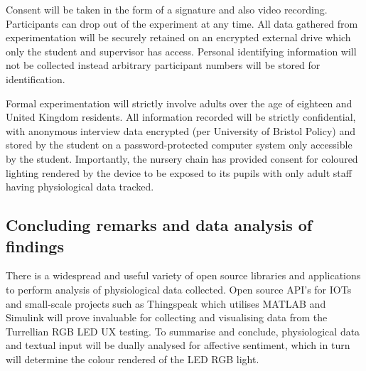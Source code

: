\documentclass{sigchi}
\begin{document}
Consent will be taken in the form of a signature and also video recording. Participants can drop out of the experiment at any time. All data gathered from experimentation will be securely retained on an encrypted external drive which only the student and supervisor has access. Personal identifying information will not be collected instead arbitrary participant numbers will be stored for identification. 

Formal experimentation will strictly involve adults over the age of eighteen and United Kingdom residents. All information recorded will be strictly confidential, with anonymous interview data encrypted (per University of Bristol Policy) and stored by the student on a password-protected computer system only accessible by the student. Importantly, the nursery chain has provided consent for coloured lighting rendered by the device to be exposed to its pupils with only adult staff having physiological data tracked. 

\subsection{Concluding remarks and data analysis of findings}

There is a widespread and useful variety of open source libraries and applications to perform analysis of physiological data collected. Open source API’s for IOTs and small-scale projects such as Thingspeak which utilises MATLAB and Simulink will prove invaluable for collecting and visualising data from the Turrellian RGB LED UX testing. To summarise and conclude, physiological data and textual input will be dually analysed for affective sentiment, which in turn will determine the colour rendered of the LED RGB light.
\end{document}

